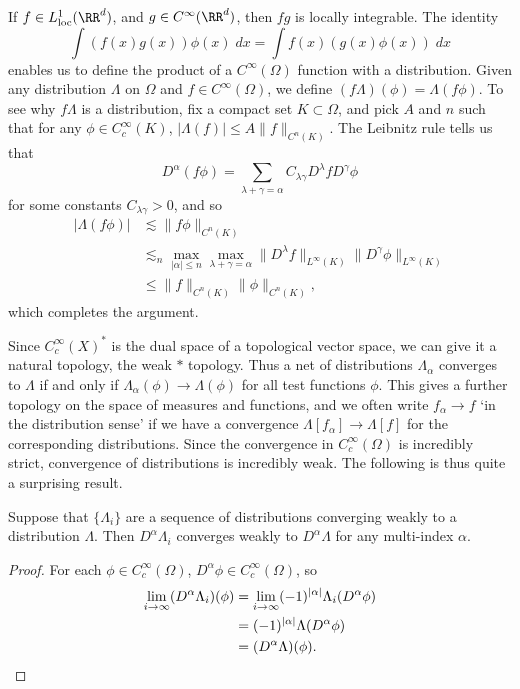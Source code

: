 If $f \in L^1_{\text{loc}}(\RR^d)$, and $g \in C^\infty(\RR^d)$, then $fg$ is locally integrable. The identity
%
\[ \int (f(x)g(x)) \phi(x)\; dx = \int f(x) (g(x) \phi(x))\; dx \]
%
enables us to define the product of a $C^\infty(\Omega)$ function with a distribution. Given any distribution $\Lambda$ on $\Omega$ and $f \in C^\infty(\Omega)$, we define $(f \Lambda)(\phi) = \Lambda(f \phi)$. To see why $f \Lambda$ is a distribution, fix a compact set $K \subset \Omega$, and pick $A$ and $n$ such that for any $\phi \in C_c^\infty(K)$, $|\Lambda(f)| \leq A \| f \|_{C^n(K)}$. The Leibnitz rule tells us that
%
\[ D^\alpha(f \phi) = \sum_{\lambda + \gamma = \alpha} C_{\lambda \gamma} D^\lambda f D^\gamma \phi \]
%
for some constants $C_{\lambda \gamma} > 0$, and so
%
\begin{align*}
  |\Lambda(f \phi)| &\lesssim \| f \phi \|_{C^n(K)}\\
  &\lesssim_n \max_{|\alpha| \leq n} \max_{\lambda + \gamma = \alpha} \| D^\lambda f \|_{L^\infty(K)} \| D^\gamma \phi \|_{L^\infty(K)}\\
  &\leq \| f \|_{C^n(K)} \| \phi \|_{C^n(K)},
\end{align*}
%
which completes the argument.

Since $C_c^\infty(X)^*$ is the dual space of a topological vector space, we can give it a natural topology, the weak $*$ topology. Thus a net of distributions $\Lambda_\alpha$ converges to $\Lambda$ if and only if $\Lambda_\alpha(\phi) \to \Lambda(\phi)$ for all test functions $\phi$. This gives a further topology on the space of measures and functions, and we often write $f_\alpha \to f$ `in the distribution sense' if we have a convergence $\Lambda[f_\alpha] \to \Lambda[f]$ for the corresponding distributions. Since the convergence in $C_c^\infty(\Omega)$ is incredibly strict, convergence of distributions is incredibly weak. The following is thus quite a surprising result.

\begin{theorem}
  Suppose that $\{ \Lambda_i \}$ are a sequence of distributions converging weakly to a distribution $\Lambda$. Then $D^\alpha \Lambda_i$ converges weakly to $D^\alpha \Lambda$ for any multi-index $\alpha$.
\end{theorem}
\begin{proof}
  For each $\phi \in C_c^\infty(\Omega)$, $D^\alpha \phi \in C_c^\infty(\Omega)$, so
  \begin{align*}
    \lim_{i \to \infty} (D^\alpha \Lambda_i)(\phi) &= \lim_{i \to \infty} (-1)^{|\alpha|} \Lambda_i(D^\alpha \phi)\\
    &= (-1)^{|\alpha|} \Lambda(D^\alpha \phi)\\
    &= (D^\alpha \Lambda)(\phi). \qedhere
  \end{align*}
\end{proof}

